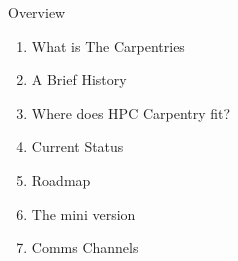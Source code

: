 \begin{frame}{Overview}
	\begin{enumerate}
		\item What is The Carpentries
		\item A Brief History
		\item Where does HPC Carpentry fit?
		\item Current Status
		\item Roadmap
		\item The mini version
		\item Comms Channels
	\end{enumerate}
\end{frame}